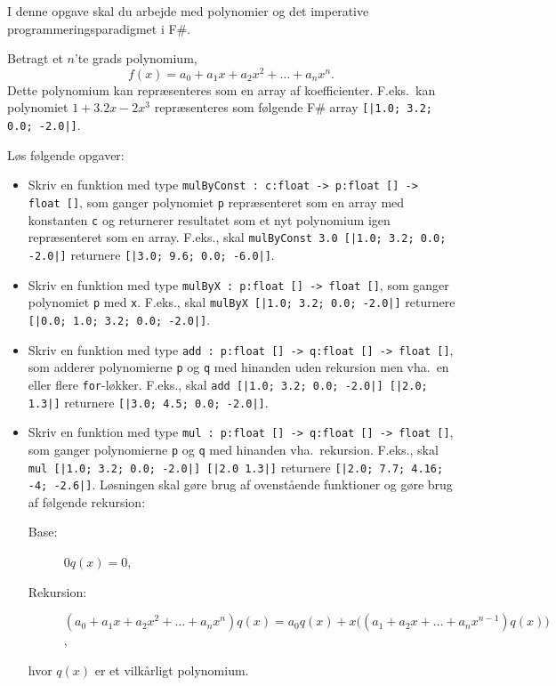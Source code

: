 I denne opgave skal du arbejde med polynomier og det imperative programmeringsparadigmet i F\#.

Betragt et $n$'te grads polynomium,
\begin{equation}
  \label{eq:1}
  f(x) = a_0+a_1x+a_2x^2+\ldots+a_nx^n.
\end{equation}
Dette polynomium kan repræsenteres som en array af koefficienter. F.eks.\ kan polynomiet $1+3.2x-2x^3$ repræsenteres som følgende F\# array \lstinline{[|1.0; 3.2; 0.0; -2.0|]}.

Løs følgende opgaver:
\begin{itemize}
\item Skriv en funktion med type \lstinline{mulByConst : c:float -> p:float [] -> float []}, som ganger polynomiet \lstinline{p} repræsenteret som en array med konstanten \lstinline{c} og returnerer resultatet som et nyt polynomium igen repræsenteret som en array. F.eks., skal \lstinline{mulByConst 3.0 [|1.0; 3.2; 0.0; -2.0|]} returnere \lstinline{[|3.0; 9.6; 0.0; -6.0|]}.
\item Skriv en funktion med type \lstinline{mulByX : p:float [] -> float []}, som ganger polynomiet \lstinline{p} med \lstinline{x}. F.eks., skal \lstinline{mulByX [|1.0; 3.2; 0.0; -2.0|]} returnere \lstinline{[|0.0; 1.0; 3.2; 0.0; -2.0|]}.
\item Skriv en funktion med type \lstinline{add : p:float [] -> q:float [] -> float []}, som adderer polynomierne \lstinline{p} og \lstinline{q} med hinanden uden rekursion men vha.\ en eller flere \lstinline{for}-løkker. F.eks., skal \lstinline{add [|1.0; 3.2; 0.0; -2.0|] [|2.0; 1.3|]} returnere \lstinline{[|3.0; 4.5; 0.0; -2.0|]}.
\item Skriv en funktion med type \lstinline{mul : p:float [] -> q:float [] -> float []}, som ganger polynomierne \lstinline{p} og \lstinline{q} med hinanden vha.\ rekursion. F.eks., skal \lstinline{mul [|1.0; 3.2; 0.0; -2.0|] [|2.0 1.3|]} returnere \lstinline{[|2.0; 7.7; 4.16; -4; -2.6|]}. Løsningen skal gøre brug af ovenstående funktioner og gøre brug af følgende rekursion:
  \begin{description}
  \item[Base:] $0 q(x) = 0$,\\
  \item[Rekursion:] $\left(a_0+a_1x+a_2x^2+\ldots+a_nx^n\right) q(x) = a_0q(x) + x\bigg(\left(a_1+a_2x+\ldots+a_nx^{n-1}\right)q(x)\bigg)$,
  \end{description}
  hvor $q(x)$ er et vilkårligt polynomium.
\end{itemize}
